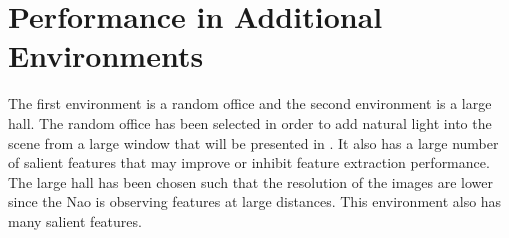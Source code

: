 \documentclass[11pt]{report}
\begin{document}

%


%
\section{Performance in Additional Environments}
\label{sec:additionalDataset}
The first environment is a random office and the second environment is a large hall. The random office has been selected in order to add natural light into the scene from a large window that will be presented in . It also has a large number of salient features that may improve or inhibit feature extraction performance. The large hall has been chosen such that the resolution of the images are lower since the Nao is observing features at large distances. This environment also has many salient features. \\
\end{document}
